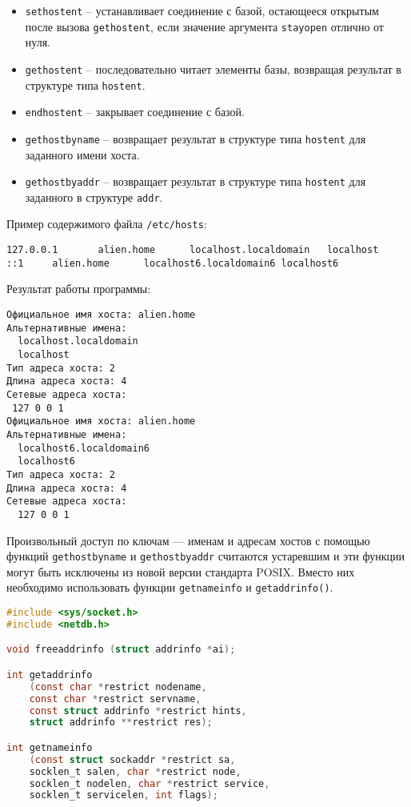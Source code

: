 \begin{itemize}
	\item {\tt sethostent} -- устанавливает соединение с базой, остающееся открытым после вызова {\tt gethostent}, если значение аргумента {\tt stayopen} отлично от нуля.
	\item {\tt gethostent} -- последовательно читает элементы базы, возвращая результат в структуре типа {\tt hostent}.
	\item {\tt endhostent} -- закрывает соединение с базой.
	\item {\tt gethostbyname} -- возвращает результат в структуре типа {\tt hostent} для заданного имени хоста.
	\item {\tt gethostbyaddr} -- возвращает результат в структуре типа {\tt hostent} для заданного в структуре {\tt addr}.	
\end{itemize}




Пример содержимого файла {\tt /etc/hosts}:
\begin{verbatim}
127.0.0.1       alien.home      localhost.localdomain   localhost
::1     alien.home      localhost6.localdomain6 localhost6
\end{verbatim}


Результат работы программы:
\begin{verbatim}
Официальное имя хоста: alien.home
Альтернативные имена:
  localhost.localdomain
  localhost
Тип адреса хоста: 2
Длина адреса хоста: 4
Сетевые адреса хоста:
 127 0 0 1
Официальное имя хоста: alien.home
Альтернативные имена:
  localhost6.localdomain6
  localhost6
Тип адреса хоста: 2
Длина адреса хоста: 4
Сетевые адреса хоста:
  127 0 0 1
\end{verbatim}

Произвольный доступ по ключам --- именам и адресам хостов с помощью функций {\tt gethostbyname} и {\tt gethostbyaddr} считаются устаревшим и эти функции могут быть исключены из новой версии стандарта POSIX. Вместо них необходимо использовать функции {\tt getnameinfo} и {\tt getaddrinfo()}.

\begin{lstlisting}[language=C]
#include <sys/socket.h>
#include <netdb.h>

void freeaddrinfo (struct addrinfo *ai);

int getaddrinfo 
    (const char *restrict nodename, 
	const char *restrict servname,
	const struct addrinfo *restrict hints,
	struct addrinfo **restrict res);

int getnameinfo 
	(const struct sockaddr *restrict sa, 
	socklen_t salen, char *restrict node, 
	socklen_t nodelen, char *restrict service,
	socklen_t servicelen, int flags);
\end{lstlisting}

